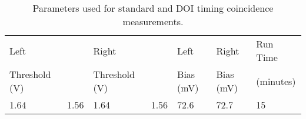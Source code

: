 \begin{table}
\caption{\label{tab:optimumparam} Parameters used for standard and DOI timing coincidence measurements.} 
\begin{tabular}{lllllll}
\hline
Left &  & Right &  & Left & Right & Run Time\\
Threshold (V) & & Threshold (V)& & Bias (mV) & Bias (mV) & (minutes)\\
\hline
1.64&  1.56 &  1.64 &  1.56 &  72.6 &  72.7 & 15\\
\hline
\end{tabular}
\end{table}

